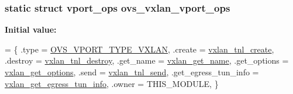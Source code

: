 \subsubsection[{ovs\+\_\+vxlan\+\_\+vport\+\_\+ops}]{\setlength{\rightskip}{0pt plus 5cm}static struct {\bf vport\+\_\+ops} ovs\+\_\+vxlan\+\_\+vport\+\_\+ops\hspace{0.3cm}{\ttfamily [static]}}\label{vport-vxlan_8c_a14100e1b742c7bb52f41541582330814}
{\bfseries Initial value\+:}
\begin{DoxyCode}
= \{
    .type           = \hyperlink{openvswitch_8h_a9a1b861aa99bd83177a2b10b34745b0aabd94b320598ca17b189318d8e27ac1b0}{OVS\_VPORT\_TYPE\_VXLAN},
    .create         = \hyperlink{vport-vxlan_8c_a15944f1b89ca72bfaf953d278bf09ca7}{vxlan\_tnl\_create},
    .destroy        = \hyperlink{vport-vxlan_8c_aade4bb74066fe5f4ab11820ab7c90485}{vxlan\_tnl\_destroy},
    .get\_name       = \hyperlink{vport-vxlan_8c_a8c4bc3ac94b12c027f1c2148fae55d61}{vxlan\_get\_name},
    .get\_options        = \hyperlink{vport-vxlan_8c_a50ef73121a1de8be6425c76ea97fc3da}{vxlan\_get\_options},
    .send           = \hyperlink{vport-vxlan_8c_a3f79b05ea9b700c041b3aff7361e707f}{vxlan\_tnl\_send},
    .get\_egress\_tun\_info    = \hyperlink{vport-vxlan_8c_a24930f1f6ecb4c221d189f13253a5feb}{vxlan\_get\_egress\_tun\_info},
    .owner          = THIS\_MODULE,
\}
\end{DoxyCode}
